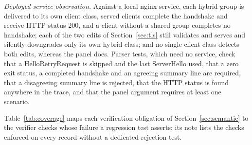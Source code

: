 \documentclass[journal]{IEEEtran}
\begin{document}
\emph{Deployed-service observation.} Against a local nginx service, each hybrid group is delivered to its own client class, served clients complete the handshake and receive HTTP status 200, and a client without a shared group completes no handshake; each of the two edits of Section~\ref{sec:tls} still validates and serves and silently downgrades only its own hybrid class; and no single client class detects both edits, whereas the panel does. Parser tests, which need no service, check that a HelloRetryRequest is skipped and the last ServerHello used, that a zero exit status, a completed handshake and an agreeing summary line are required, that a disagreeing summary line is rejected, that the HTTP status is found anywhere in the trace, and that the panel argument requires at least one scenario.

Table~\ref{tab:coverage} maps each verification obligation of Section~\ref{sec:semantic} to the verifier checks whose failure a regression test asserts; its note lists the checks enforced on every record without a dedicated rejection test.
\end{document}

